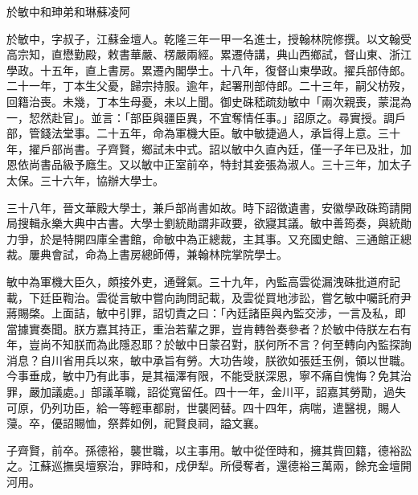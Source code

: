 
\begin{pinyinscope}
於敏中和珅弟和琳蘇凌阿

於敏中，字叔子，江蘇金壇人。乾隆三年一甲一名進士，授翰林院修撰。以文翰受高宗知，直懋勤殿，敕書華嚴、楞嚴兩經。累遷侍講，典山西鄉試，督山東、浙江學政。十五年，直上書房。累遷內閣學士。十八年，復督山東學政。擢兵部侍郎。二十一年，丁本生父憂，歸宗持服。逾年，起署刑部侍郎。二十三年，嗣父枋歿，回籍治喪。未幾，丁本生母憂，未以上聞。御史硃嵇疏劾敏中「兩次親喪，蒙混為一，恝然赴官」。並言：「部臣與疆臣異，不宜奪情任事。」詔原之。尋實授。調戶部，管錢法堂事。二十五年，命為軍機大臣。敏中敏捷過人，承旨得上意。三十年，擢戶部尚書。子齊賢，鄉試未中式。詔以敏中久直內廷，僅一子年已及壯，加恩依尚書品級予廕生。又以敏中正室前卒，特封其妾張為淑人。三十三年，加太子太保。三十六年，協辦大學士。

三十八年，晉文華殿大學士，兼戶部尚書如故。時下詔徵遺書，安徽學政硃筠請開局搜輯永樂大典中古書。大學士劉統勛謂非政要，欲寢其議。敏中善筠奏，與統勛力爭，於是特開四庫全書館，命敏中為正總裁，主其事。又充國史館、三通館正總裁。屢典會試，命為上書房總師傅，兼翰林院掌院學士。

敏中為軍機大臣久，頗接外吏，通聲氣。三十九年，內監高雲從漏洩硃批道府記載，下廷臣鞫治。雲從言敏中嘗向詢問記載，及雲從買地涉訟，嘗乞敏中囑託府尹蔣賜棨。上面詰，敏中引罪，詔切責之曰：「內廷諸臣與內監交涉，一言及私，即當據實奏聞。朕方嘉其持正，重治若輩之罪，豈肯轉咎奏參者？於敏中侍朕左右有年，豈尚不知朕而為此隱忍耶？於敏中日蒙召對，朕何所不言？何至轉向內監探詢消息？自川省用兵以來，敏中承旨有勞。大功告竣，朕欲如張廷玉例，領以世職。今事垂成，敏中乃有此事，是其福澤有限，不能受朕深恩，寧不痛自愧悔？免其治罪，嚴加議處。」部議革職，詔從寬留任。四十一年，金川平，詔嘉其勞勩，過失可原，仍列功臣，給一等輕車都尉，世襲罔替。四十四年，病喘，遣醫視，賜人蓡。卒，優詔賜恤，祭葬如例，祀賢良祠，謚文襄。

子齊賢，前卒。孫德裕，襲世職，以主事用。敏中從侄時和，擁其貲回籍，德裕訟之。江蘇巡撫吳壇察治，罪時和，戍伊犁。所侵奪者，還德裕三萬兩，餘充金壇開河用。


\end{pinyinscope}
